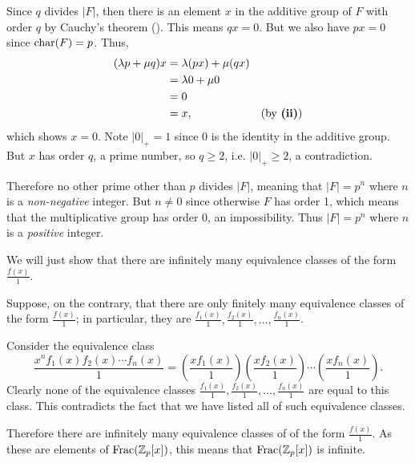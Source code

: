 \begin{questions}
\begin{partquestions}{\roman*}
        \item Since $q$ divides $|F|$, then there is an element $x$ in the additive group of $F$ with order $q$ by Cauchy's theorem (). This means $qx = 0$. But we also have $px = 0$ since $\mathrm{char}(F) = p$. Thus,
        \begin{align*}
            (\lambda p + \mu q)x &= \lambda (px) + \mu (qx) \\
            &= \lambda 0 + \mu 0\\
            &= 0\\
            &= x, & (\text{by \textbf{(ii)}})
        \end{align*}
        which shows $x = 0$. Note $|0|_+ = 1$ since 0 is the identity in the additive group. But $x$ has order $q$, a prime number, so $q \geq 2$, i.e. $|0|_+ \geq 2$, a contradiction.
        
        Therefore no other prime other than $p$ divides $|F|$, meaning that $|F| = p^n$ where $n$ is a \textit{non-negative} integer. But $n \neq 0$ since otherwise $F$ has order 1, which means that the multiplicative group has order 0, an impossibility. Thus $|F| = p^n$ where $n$ is a \textit{positive} integer.
    \end{partquestions}
    
    \item \begin{partquestions}{\alph*}
        \item We will just show that there are infinitely many equivalence classes of the form $\frac{f(x)}1$.
        
        Suppose, on the contrary, that there are only finitely many equivalence classes of the form $\frac{f(x)}1$; in particular, they are $\frac{f_1(x)}1, \frac{f_2(x)}1, \dots, \frac{f_n(x)}1$.

        Consider the equivalence class
        \[
            \frac{x^nf_1(x)f_2(x)\cdots f_n(x)}{1} = \left(\frac{xf_1(x)}{1}\right)\left(\frac{xf_2(x)}{1}\right)\cdots\left(\frac{xf_n(x)}{1}\right).
        \]
        Clearly none of the equivalence classes $\frac{f_1(x)}1, \frac{f_2(x)}1, \dots, \frac{f_n(x)}1$ are equal to this class. This contradicts the fact that we have listed all of such equivalence classes.

        Therefore there are infinitely many equivalence classes of of the form $\frac{f(x)}1$. As these are elements of $\mathrm{Frac}(\mathbb{Z}_p[x])$, this means that $\mathrm{Frac}(\mathbb{Z}_p[x])$ is infinite.
        

\end{partquestions}
\end{questions}
